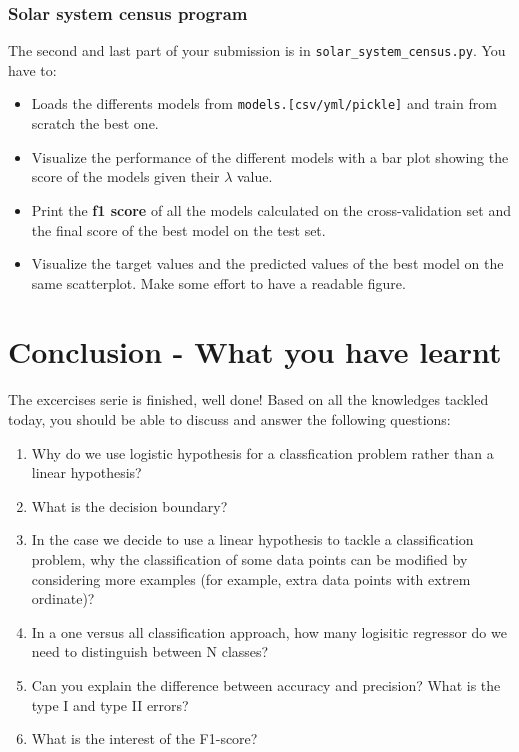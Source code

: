 \documentclass{42-en}
\begin{document}
\subsection*{Solar system census program}
The second and last part of your submission is in \texttt{solar\_system\_census.py}. You have to:
\begin{itemize}
  \item Loads the differents models from \texttt{models.[csv/yml/pickle]} and train from scratch the best one.
  \item Visualize the performance of the different models with a bar plot showing the score of the models given their $\lambda$ value.
  \item Print the \textbf{f1 score} of all the models calculated on the cross-validation set and the final score of the best model on
        the test set.
  \item Visualize the target values and the predicted values of the best model on the same scatterplot. Make some effort to have a readable figure.
\end{itemize}


\newpage

\chapter{Conclusion - What you have learnt}

The excercises serie is finished, well done!
Based on all the knowledges tackled today, you should be able to discuss and answer the following questions:

\begin{enumerate}
  \item Why do we use logistic hypothesis for a classfication problem rather than a linear hypothesis?
  \item What is the decision boundary?
  \item In the case we decide to use a linear hypothesis to tackle a classification problem, why the classification of some data points can be modified by considering more examples (for example, extra data points with extrem ordinate)?
  \item In a one versus all classification approach, how many logisitic regressor do we need to distinguish between N classes?
  \item Can you explain the difference between accuracy and precision? What is the type I and type II errors?
  \item What is the interest of the F1-score?
\end{enumerate}
\end{document}
